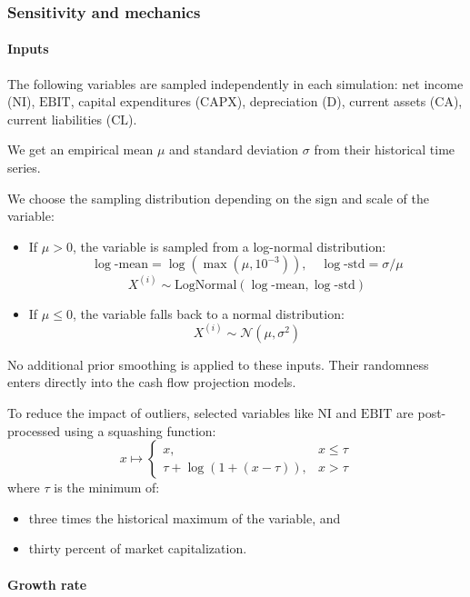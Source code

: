 \subsubsection{Sensitivity and mechanics}

\paragraph{Inputs}

The following variables are sampled independently in each simulation: 
net income ($\text{NI}$), 
$\text{EBIT}$, 
capital expenditures ($\text{CAPX}$), 
depreciation ($\text{D}$), 
current assets ($\text{CA}$), 
current liabilities ($\text{CL}$).

We get an empirical mean $\mu$ and standard deviation $\sigma$ from their historical time series. 

We choose the sampling distribution depending on the sign and scale of the variable:

\begin{itemize}
  \item If $\mu > 0$, the variable is sampled from a log-normal distribution:
  \[
  \log\text{-mean} = \log(\max(\mu, 10^{-3})), \quad \log\text{-std} = \sigma / \mu
  \]
  \[
  X^{(i)} \sim \text{LogNormal}(\log\text{-mean}, \log\text{-std})
  \]

  \item If $\mu \leq 0$, the variable falls back to a normal distribution:
  \[
  X^{(i)} \sim \mathcal{N}(\mu, \sigma^2)
  \]
\end{itemize}

No additional prior smoothing is applied to these inputs. Their randomness enters directly into the cash flow projection models.

To reduce the impact of outliers, selected variables like $\text{NI}$ and $\text{EBIT}$ are post-processed using a squashing function:
\[
x \mapsto 
\begin{cases}
x, & x \leq \tau \\
\tau + \log(1 + (x - \tau)), & x > \tau
\end{cases}
\]
where $\tau$ is the minimum of:
\begin{itemize}
  \item three times the historical maximum of the variable, and
  \item thirty percent of market capitalization.
\end{itemize}


\paragraph{Growth rate}

